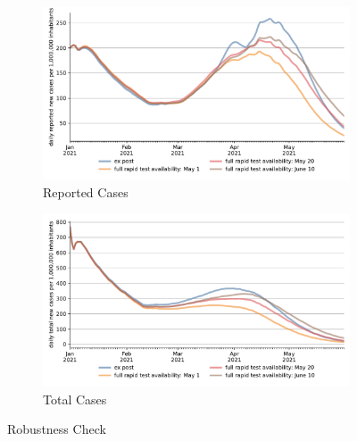 \begin{figure}[ht] %
  \centering
  \begin{subfigure}[b]{.49\textwidth}
    \centering
    \includegraphics[width=0.9 \textwidth]{figures/results/figures/scenario_comparisons/robustness_check/full_new_known_case}
    \caption{Reported Cases}
    \label{fig:robustness_check_new_known_case}
  \end{subfigure}%
  \hfill
  \begin{subfigure}[b]{.49\textwidth}
    \centering
    \includegraphics[width=0.9 \textwidth]{figures/results/figures/scenario_comparisons/robustness_check/full_newly_infected}
    \caption{Total Cases}
    \label{fig:robustness_check_newly_infected}
  \end{subfigure}
  \caption{Robustness Check}
  \label{fig:robustness_check_detailed}
\end{figure}



